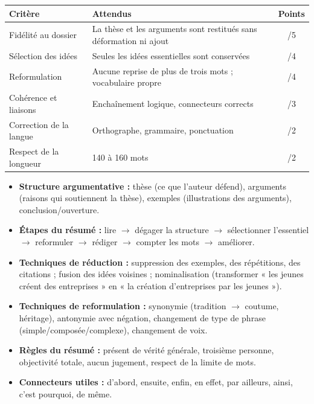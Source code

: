 \documentclass[11pt]{article}
\newcounter{popsec}
\newcounter{popsub}
\newcommand{\courssub}[1]{%
  \stepcounter{popsub}%
  \par\vspace{9pt}\noindent{\popxbold\fontsize{11.5}{13}\selectfont\color{popink}{\color{poporange}\thepopsec.\thepopsub}\hspace{6pt}#1}\par\nopagebreak\vspace{4pt}
}
\begin{document}
\begin{center}
\begin{tabularx}{\linewidth}{|l|X|c|}
\hline
\rowcolor{popblueL} \textbf{Critère} & \textbf{Attendus} & \textbf{Points} \\
\hline
Fidélité au dossier & La thèse et les arguments sont restitués sans déformation ni ajout & /5 \\
\hline
Sélection des idées & Seules les idées essentielles sont conservées & /4 \\
\hline
Reformulation & Aucune reprise de plus de trois mots ; vocabulaire propre & /4 \\
\hline
Cohérence et liaisons & Enchaînement logique, connecteurs corrects & /3 \\
\hline
Correction de la langue & Orthographe, grammaire, ponctuation & /2 \\
\hline
Respect de la longueur & 140 à 160 mots & /2 \\
\hline
\end{tabularx}
\end{center}

\courssub{Ressources à mobiliser}

\begin{aretenir}
\begin{itemize}
\item \textbf{Structure argumentative :} thèse (ce que l'auteur défend), arguments (raisons qui soutiennent la thèse), exemples (illustrations des arguments), conclusion/ouverture.
\item \textbf{Étapes du résumé :} lire $\rightarrow$ dégager la structure $\rightarrow$ sélectionner l'essentiel $\rightarrow$ reformuler $\rightarrow$ rédiger $\rightarrow$ compter les mots $\rightarrow$ améliorer.
\item \textbf{Techniques de réduction :} suppression des exemples, des répétitions, des citations ; fusion des idées voisines ; nominalisation (transformer « les jeunes créent des entreprises » en « la création d'entreprises par les jeunes »).
\item \textbf{Techniques de reformulation :} synonymie (tradition $\rightarrow$ coutume, héritage), antonymie avec négation, changement de type de phrase (simple/composée/complexe), changement de voix.
\item \textbf{Règles du résumé :} présent de vérité générale, troisième personne, objectivité totale, aucun jugement, respect de la limite de mots.
\item \textbf{Connecteurs utiles :} d'abord, ensuite, enfin, en effet, par ailleurs, ainsi, c'est pourquoi, de même.
\end{itemize}
\end{aretenir}
\end{document}
